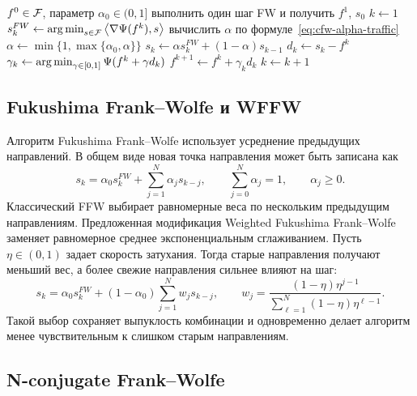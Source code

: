\begin{algorithm}
\caption{Conjugate Frank--Wolfe}
\begin{algorithmic}
\REQUIRE $f^0\in\mathcal{F}$, параметр $\alpha_0\in(0,1]$
\STATE выполнить один шаг FW и получить $f^1$, $s_0$
\STATE $k\gets 1$
\REPEAT
\STATE $s_k^{FW}\gets\operatorname*{arg\,min}_{s\in\mathcal{F}}\left\langle \nabla\Psi(f^k), s \right\rangle$
\STATE вычислить $\alpha$ по формуле~\eqref{eq:cfw-alpha-traffic}
\STATE $\alpha\gets\min\{1,\max\{\alpha_0,\alpha\}\}$
\STATE $s_k\gets\alpha s_k^{FW}+(1-\alpha)s_{k-1}$
\STATE $d_k\gets s_k-f^k$
\STATE $\gamma_k\gets\operatorname*{arg\,min}_{\gamma\in[0,1]}\Psi(f^k+\gamma d_k)$
\STATE $f^{k+1}\gets f^k+\gamma_k d_k$
\STATE $k\gets k+1$
\end{algorithmic}
\end{algorithm}

\subsection{Fukushima Frank--Wolfe и WFFW}

Алгоритм Fukushima Frank--Wolfe использует усреднение предыдущих направлений.
В общем виде новая точка направления может быть записана как
\begin{equation}
    s_k=
    \alpha_0 s_k^{FW}
    +
    \sum_{j=1}^{N}\alpha_j s_{k-j},
    \qquad
    \sum_{j=0}^{N}\alpha_j=1,
    \qquad
    \alpha_j\geq 0.
    \label{eq:fukushima-general}
\end{equation}
Классический FFW выбирает равномерные веса по нескольким предыдущим направлениям.
Предложенная модификация Weighted Fukushima Frank--Wolfe заменяет равномерное среднее экспоненциальным сглаживанием.
Пусть $\eta\in(0,1)$ задает скорость затухания.
Тогда старые направления получают меньший вес, а более свежие направления сильнее влияют на шаг:
\[
    s_k=
    \alpha_0 s_k^{FW}
    +
    (1-\alpha_0)
    \sum_{j=1}^{N} w_j s_{k-j},
    \qquad
    w_j=
    \frac{(1-\eta)\eta^{j-1}}{\sum_{\ell=1}^{N}(1-\eta)\eta^{\ell-1}}.
\]
Такой выбор сохраняет выпуклость комбинации и одновременно делает алгоритм менее чувствительным к слишком старым направлениям.

\subsection{N-conjugate Frank--Wolfe}

